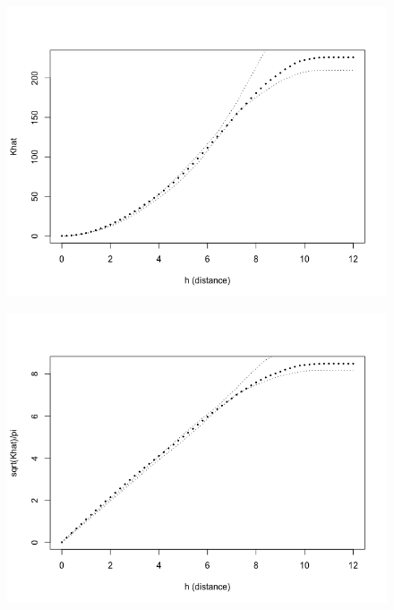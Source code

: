 \documentclass[12pt]{article}
\makeatletter
\theoremstyle{homework}
\newenvironment{exercise}[1]
{\def\@currentlabel{#1}\exercisecore}
{\endexercisecore}
\makeatother
\begin{document}
\begin{exercise}{7}
\begin{enumerate}
    \begin{figure}[H]
      \begin{center}
      \includegraphics[width = .9\textwidth]{Rplot03.png}
      \end{center}
    \end{figure} 

    \begin{figure}[H]
      \begin{center}
      \includegraphics[width = .9\textwidth]{Rplot04.png}
      \end{center}
    \end{figure} 




\end{enumerate}
\end{exercise}
\end{document}
